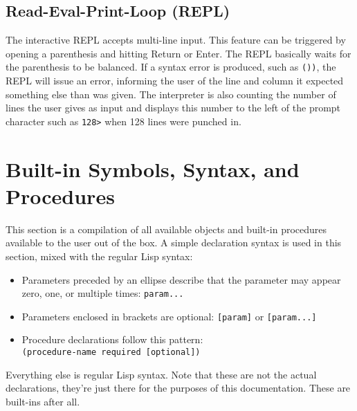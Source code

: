 \documentclass[a4paper]{scrartcl}
\newcommand{\lisp}{Lisp}
\begin{document}
\subsection{Read-Eval-Print-Loop (REPL)}
\label{usage/repl}
	The interactive REPL accepts multi-line input. This feature can be triggered by opening a parenthesis and hitting Return or Enter. The REPL basically waits for the parenthesis to be balanced. If a syntax error is produced, such as \lstinline|())|, the REPL will issue an error, informing the user of the line and column it expected something else than was given. The interpreter is also counting the number of lines the user gives as input and displays this number to the left of the prompt character such as \lstinline|128>| when 128 lines were punched in.

\section{Built-in Symbols, Syntax, and Procedures}
\label{builtins}
	This section is a compilation of all available objects and built-in procedures available to the user out of the box. A simple declaration syntax is used in this section, mixed with the regular \lisp{} syntax:

	\begin{itemize}
		\item Parameters preceded by an ellipse describe that the parameter may appear zero, one, or multiple times: \lstinline|param...|
		\item Parameters enclosed in brackets are optional: \lstinline|[param]| or \lstinline|[param...]|
		\item Procedure declarations follow this pattern:\\
			  \lstinline|(procedure-name required [optional])|
	\end{itemize}

	Everything else is regular \lisp{} syntax. Note that these are not the actual declarations, they're just there for the purposes of this documentation. These are built-ins after all.

	

	
	
	
	
	
	
	
	

	
	
	
	
	
	
	
	
	
	
	
	
	
	
	
	
	
	
\end{document}
